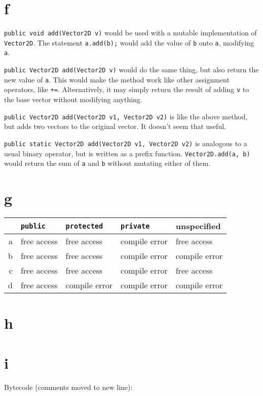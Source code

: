 \documentclass[11pt]{article}
\begin{document}
\section*{f}
\texttt{public void add(Vector2D v)} would be used with a mutable implementation of \texttt{Vector2D}. The statement \texttt{a.add(b);} would add the value of \texttt b onto \texttt a, modifying \texttt a.

\texttt{public Vector2D add(Vector2D v)} would do the same thing, but also return the new value of \texttt a. This would make the method work like other assignment operators, like \texttt{+=}. Alternatively, it may simply return the result of adding \texttt v to the base vector without modifying anything.

\texttt{public Vector2D add(Vector2D v1, Vector2D v2)} is like the above method, but adds two vectors to the original vector. It doesn't seem that useful.

\texttt{public static Vector2D add(Vector2D v1, Vector2D v2)} is analogous to a usual binary operator, but is written as a prefix function. \texttt{Vector2D.add(a, b)} would return the sum of \texttt a and \texttt b without mutating either of them.

\section*{g}
\begin{tabular}{r|llll}
  & \texttt{public} & \texttt{protected} & \texttt{private} & unspecified\\
  \hline
  a & free access & free access & compile error & free access\\
  b & free access & free access & compile error & compile error\\
  c & free access & free access & compile error & free access\\
  d & free access & compile error & compile error & compile error\\
\end{tabular}

\section*{h}


\section*{i}
Bytecode (comments moved to new line):

\end{document}
